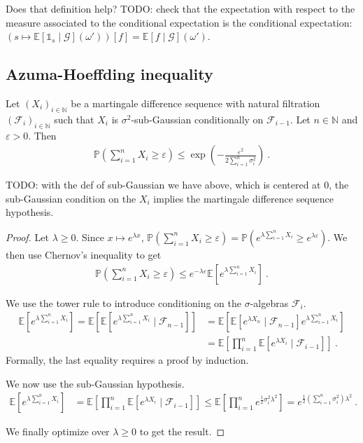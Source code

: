 Does that definition help? TODO: check that the expectation with respect to the measure associated to the conditional expectation is the conditional expectation: $(s \mapsto \mathbb{E}[\mathbb{1}_s \mid \mathcal G](\omega'))[f] = \mathbb{E}[f \mid \mathcal G](\omega')$.

\subsection{Azuma-Hoeffding inequality}
\label{sub:azuma_hoeffding_inequality}

\begin{theorem}
Let $(X_i)_{i\in \mathbb{N}}$ be a martingale difference sequence with natural filtration $(\mathcal F_i)_{i\in \mathbb{N}}$ such that $X_i$ is $\sigma^2$-sub-Gaussian conditionally on $\mathcal F_{i-1}$. Let $n \in \mathbb{N}$ and $\varepsilon > 0$. Then
\begin{align*}
\mathbb{P}(\sum_{i=1}^n X_i \ge \varepsilon) \le \exp \left( - \frac{\varepsilon^2}{2 \sum_{i=1}^n \sigma_i^2} \right) \: .
\end{align*}
\end{theorem}

TODO: with the def of sub-Gaussian we have above, which is centered at 0, the sub-Gaussian condition on the $X_i$ implies the martingale difference sequence hypothesis.

\begin{proof}
Let $\lambda \ge 0$. Since $x \mapsto e^{\lambda x}$, $\mathbb{P}(\sum_{i=1}^n X_i \ge \varepsilon) = \mathbb{P}(e^{\lambda\sum_{i=1}^n X_i} \ge e^{\lambda\varepsilon})$. We then use Chernov's inequality to get
\begin{align*}
\mathbb{P}(\sum_{i=1}^n X_i \ge \varepsilon)
\le e^{-\lambda \varepsilon} \mathbb{E}\left[ e^{\lambda\sum_{i=1}^n X_i} \right]
\: .
\end{align*}

We use the tower rule to introduce conditioning on the $\sigma$-algebras $\mathcal F_i$.
\begin{align*}
\mathbb{E}\left[ e^{\lambda\sum_{i=1}^n X_i} \right]
= \mathbb{E}\left[ \mathbb{E}\left[ e^{\lambda\sum_{i=1}^n X_i} \mid \mathcal F_{n-1} \right] \right]
&= \mathbb{E}\left[ \mathbb{E}\left[ e^{\lambda X_n} \mid \mathcal F_{n-1} \right] e^{\lambda\sum_{i=1}^n X_i} \right]
\\
&= \mathbb{E}\left[\prod_{i=1}^n \mathbb{E}\left[ e^{\lambda X_i} \mid \mathcal F_{i-1} \right] \right]
\: .
\end{align*}
Formally, the last equality requires a proof by induction.

We now use the sub-Gaussian hypothesis.
\begin{align*}
\mathbb{E}\left[ e^{\lambda\sum_{i=1}^n X_i} \right]
&= \mathbb{E}\left[\prod_{i=1}^n \mathbb{E}\left[ e^{\lambda X_i} \mid \mathcal F_{i-1} \right] \right]
\le \mathbb{E}\left[\prod_{i=1}^n e^{\frac{1}{2} \sigma_i^2 \lambda^2} \right]
= e^{\frac{1}{2} (\sum_{i=1}^n \sigma_i^2) \lambda^2}
\: .
\end{align*}

We finally optimize over $\lambda \ge 0$ to get the result.
\end{proof}
